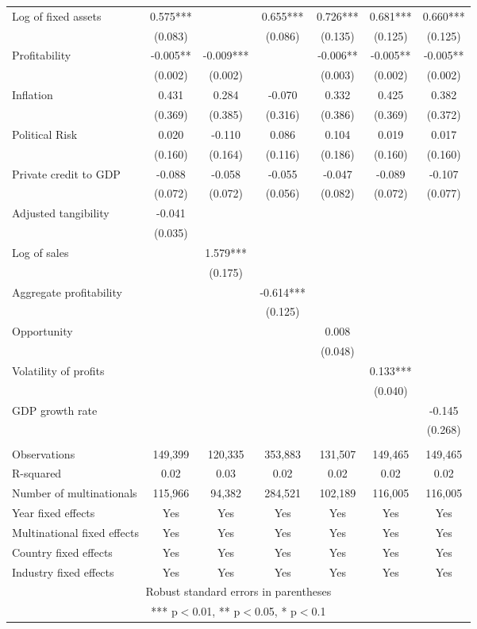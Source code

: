 \begin{tabular}{lcccccc}
Log of fixed assets & 0.575*** &  & 0.655*** & 0.726*** & 0.681*** & 0.660*** \\
 & (0.083) &  & (0.086) & (0.135) & (0.125) & (0.125) \\
Profitability & -0.005** & -0.009*** &  & -0.006** & -0.005** & -0.005** \\
 & (0.002) & (0.002) &  & (0.003) & (0.002) & (0.002) \\
Inflation & 0.431 & 0.284 & -0.070 & 0.332 & 0.425 & 0.382 \\
 & (0.369) & (0.385) & (0.316) & (0.386) & (0.369) & (0.372) \\
Political Risk & 0.020 & -0.110 & 0.086 & 0.104 & 0.019 & 0.017 \\
 & (0.160) & (0.164) & (0.116) & (0.186) & (0.160) & (0.160) \\
Private credit to GDP & -0.088 & -0.058 & -0.055 & -0.047 & -0.089 & -0.107 \\
 & (0.072) & (0.072) & (0.056) & (0.082) & (0.072) & (0.077) \\
Adjusted tangibility & -0.041 &  &  &  &  &  \\
 & (0.035) &  &  &  &  &  \\
Log of sales &  & 1.579*** &  &  &  &  \\
 &  & (0.175) &  &  &  &  \\
Aggregate profitability &  &  & -0.614*** &  &  &  \\
 &  &  & (0.125) &  &  &  \\
Opportunity &  &  &  & 0.008 &  &  \\
 &  &  &  & (0.048) &  &  \\
Volatility of profits &  &  &  &  & 0.133*** &  \\
 &  &  &  &  & (0.040) &  \\
GDP growth rate &  &  &  &  &  & -0.145 \\
 &  &  &  &  &  & (0.268) \\
 &  &  &  &  &  &  \\
Observations & 149,399 & 120,335 & 353,883 & 131,507 & 149,465 & 149,465 \\
R-squared & 0.02 & 0.03 & 0.02 & 0.02 & 0.02 & 0.02 \\
Number of multinationals & 115,966 & 94,382 & 284,521 & 102,189 & 116,005 & 116,005 \\
Year fixed effects & Yes & Yes & Yes & Yes & Yes & Yes \\
Multinational fixed effects & Yes & Yes & Yes & Yes & Yes & Yes \\
Country fixed effects & Yes & Yes & Yes & Yes & Yes & Yes \\
 Industry fixed effects & Yes & Yes & Yes & Yes & Yes & Yes \\ \hline
\multicolumn{7}{c}{ Robust standard errors in parentheses} \\
\multicolumn{7}{c}{ *** p$<$0.01, ** p$<$0.05, * p$<$0.1} \\
\end{tabular}
